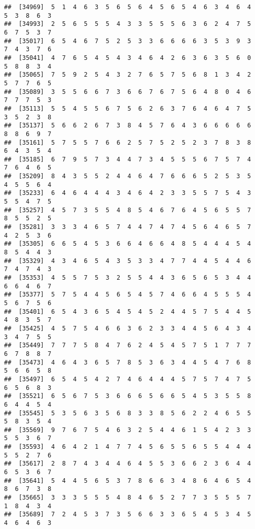 \documentclass[
]{book}
\begin{document}
\begin{verbatim}
##  [34969]  5  1  4  6  3  5  6  5  6  4  5  6  5  4  6  3  4  6  4  5  3  8  6  3
##  [34993]  2  5  6  5  5  5  4  3  3  5  5  5  6  3  6  2  4  7  5  6  7  5  3  7
##  [35017]  6  5  4  6  7  5  2  5  3  3  6  6  6  6  3  5  3  9  3  7  4  3  7  6
##  [35041]  4  7  6  5  4  5  4  3  4  6  4  2  6  3  6  3  5  6  0  5  8  8  3  4
##  [35065]  7  5  9  2  5  4  3  2  7  6  5  7  5  6  8  1  3  4  2  5  7  7  6  5
##  [35089]  3  5  5  6  6  7  3  6  6  7  6  7  5  6  4  8  0  4  6  7  7  7  5  3
##  [35113]  5  5  4  5  5  6  7  5  6  2  6  3  7  6  4  6  4  7  5  3  5  2  3  8
##  [35137]  5  6  6  2  6  7  3  8  4  5  7  6  4  3  6  6  6  6  6  8  8  6  9  7
##  [35161]  5  7  5  5  7  6  6  2  5  7  5  2  5  2  3  7  8  3  8  6  4  3  5  4
##  [35185]  6  7  9  5  7  3  4  4  7  3  4  5  5  5  6  7  5  7  4  7  6  4  6  5
##  [35209]  8  4  3  5  5  2  4  4  6  4  7  6  6  6  5  2  5  3  5  4  5  5  6  4
##  [35233]  6  4  6  4  4  4  3  4  6  4  2  3  3  5  5  7  5  4  3  5  5  4  7  5
##  [35257]  4  5  7  3  5  5  4  8  5  4  6  7  6  4  5  6  5  5  7  8  5  5  2  5
##  [35281]  3  3  3  4  6  5  7  4  4  7  4  7  4  5  6  4  6  5  7  4  2  5  3  6
##  [35305]  6  6  5  4  5  3  6  6  4  6  6  4  8  5  4  4  4  5  4  8  5  4  4  3
##  [35329]  4  3  4  6  5  4  3  5  3  3  4  7  7  4  4  5  4  4  6  7  4  7  4  3
##  [35353]  4  5  5  7  5  3  2  5  5  4  4  3  6  5  6  5  3  4  4  6  6  4  6  7
##  [35377]  5  7  5  4  4  5  6  5  4  5  7  4  6  6  4  5  5  5  4  5  6  7  5  6
##  [35401]  6  5  4  3  6  5  4  5  4  5  2  4  4  5  7  5  4  4  5  4  8  3  5  7
##  [35425]  4  5  7  5  4  6  6  3  6  2  3  3  4  4  5  6  4  3  4  3  4  7  5  5
##  [35449]  7  7  7  5  8  4  7  6  2  4  5  4  5  7  5  1  7  7  7  6  7  8  8  7
##  [35473]  4  6  4  3  6  5  7  8  5  3  6  3  4  4  5  4  7  6  8  5  6  6  5  8
##  [35497]  6  5  4  5  4  2  7  4  6  4  4  4  5  7  5  7  4  7  5  6  5  6  8  3
##  [35521]  6  5  6  7  5  3  6  6  6  5  6  6  5  4  5  3  5  5  8  6  4  4  5  4
##  [35545]  5  3  5  6  3  5  6  8  3  3  8  5  6  2  2  4  6  5  5  5  8  3  5  4
##  [35569]  9  7  6  7  5  4  6  3  2  5  4  4  6  1  5  4  2  3  3  5  5  3  6  7
##  [35593]  4  6  4  2  1  4  7  7  4  5  6  5  5  6  5  5  4  4  4  5  5  2  7  6
##  [35617]  2  8  7  4  3  4  4  6  4  5  5  3  6  6  2  3  6  4  4  6  5  3  6  7
##  [35641]  5  4  4  5  6  5  3  7  8  6  6  3  4  8  6  4  6  5  4  8  6  7  3  8
##  [35665]  3  3  3  5  5  5  4  8  4  6  5  2  7  7  3  5  5  5  7  1  8  4  3  4
##  [35689]  7  2  4  5  3  7  3  5  6  6  3  3  6  5  4  5  3  4  5  4  6  4  6  3

\end{verbatim}
\end{document}
